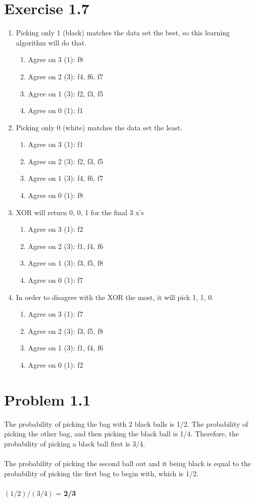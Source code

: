 \documentclass[12pt]{article}
\begin{document}
\section*{Exercise 1.7}
\begin{enumerate}[label=(\alph*)]
	\item Picking only 1 (black) matches the data set the best, so this learning algorithm will do that.
	\begin{enumerate}
		\item Agree on 3 (1): f8
		\item Agree on 2 (3): f4, f6, f7
		\item Agree on 1 (3): f2, f3, f5
		\item Agree on 0 (1): f1 
	\end{enumerate}
	\item Picking only 0 (white) matches the data set the least.
	\begin{enumerate}
		\item Agree on 3 (1): f1
		\item Agree on 2 (3): f2, f3, f5
		\item Agree on 1 (3): f4, f6, f7
		\item Agree on 0 (1): f8 
	\end{enumerate}
	\item XOR will return 0, 0, 1 for the final 3 x’s
	\begin{enumerate}
		\item Agree on 3 (1): f2
		\item Agree on 2 (3): f1, f4, f6 
		\item Agree on 1 (3): f3, f5, f8
		\item Agree on 0 (1): f7
	\end{enumerate}
	\item In order to disagree with the XOR the most, it will pick 1, 1, 0.
	\begin{enumerate}
		\item Agree on 3 (1): f7
		\item Agree on 2 (3): f3, f5, f8 
		\item Agree on 1 (3): f1, f4, f6
		\item Agree on 0 (1): f2
	\end{enumerate}
\end{enumerate}

\section*{Problem 1.1}
The probability of picking the bag with 2 black balls is 1/2. The probability of picking the other bag, and then picking the black ball is 1/4. Therefore, the probability of picking a black ball first is 3/4.
\\ \\ The probability of picking the second ball out and it being black is equal to the probability of picking the first bag to begin with, which is 1/2.
\\ \\ $(1/2) / (3/4)$ = \textbf{2/3}
\end{document}
